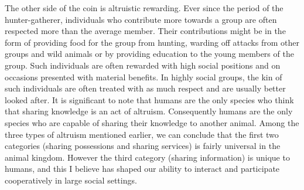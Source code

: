 \documentclass[12pt, letter]{article}
\begin{document}
The other side of the coin is altruistic rewarding. Ever since the period of the hunter-gatherer, individuals who contribute more towards a group are often respected more than the average member. Their contributions might be in the form of providing food for the group from hunting, warding off attacks from other groups and wild animals or by providing education to the young members of the group. Such individuals are often rewarded with high social positions and on occasions presented with material benefits. In highly social groups, the kin of such individuals are often treated with as much respect and are usually better looked after. It is significant to note that humans are the only species who think that sharing knowledge is an act of altruism. Consequently humans are the only species who are capable of sharing their knowledge to another animal. Among the three types of altruism mentioned earlier, we can conclude that the first two categories (sharing possessions and sharing services) is fairly universal in the animal kingdom. However the third category (sharing information) is unique to humans, and this I believe has shaped our ability to interact and participate cooperatively in large social settings.
\end{document}
